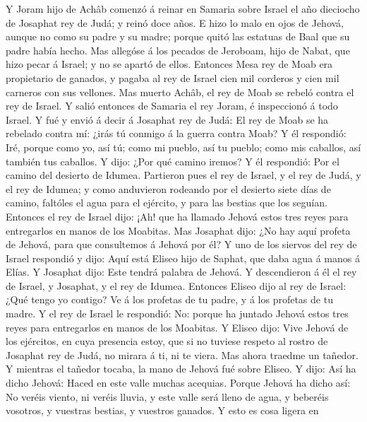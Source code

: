  Y Joram hijo de Achâb comenzó á reinar en Samaria sobre
Israel el año dieciocho de Josaphat rey de Judá; y reinó doce años.
 E hizo lo malo en ojos de Jehová, aunque no como su padre
y su madre; porque quitó las estatuas de Baal que su padre había hecho.
 Mas allegóse á los pecados de Jeroboam, hijo de Nabat,
que hizo pecar á Israel; y no se apartó de ellos. 
Entonces Mesa rey de Moab era propietario de ganados, y pagaba al rey de
Israel cien mil corderos y cien mil carneros con sus vellones.
 Mas muerto Achâb, el rey de Moab se rebeló contra el rey
de Israel.  Y salió entonces de Samaria el rey Joram, é
inspeccionó á todo Israel.  Y fué y envió á decir á
Josaphat rey de Judá: El rey de Moab se ha rebelado contra mí: ¿irás tú
conmigo á la guerra contra Moab? Y él respondió: Iré, porque como yo,
así tú; como mi pueblo, así tu pueblo; como mis caballos, así también
tus caballos.  Y dijo: ¿Por qué camino iremos? Y él
respondió: Por el camino del desierto de Idumea. 
Partieron pues el rey de Israel, y el rey de Judá, y el rey de Idumea; y
como anduvieron rodeando por el desierto siete días de camino, faltóles
el agua para el ejército, y para las bestias que los seguían.
 Entonces el rey de Israel dijo: ¡Ah! que ha llamado
Jehová estos tres reyes para entregarlos en manos de los Moabitas.
 Mas Josaphat dijo: ¿No hay aquí profeta de Jehová, para
que consultemos á Jehová por él? Y uno de los siervos del rey de Israel
respondió y dijo: Aquí está Eliseo hijo de Saphat, que daba agua á manos
á Elías.  Y Josaphat dijo: Este tendrá palabra de Jehová.
Y descendieron á él el rey de Israel, y Josaphat, y el rey de Idumea.
 Entonces Eliseo dijo al rey de Israel: ¿Qué tengo yo
contigo? Ve á los profetas de tu padre, y á los profetas de tu madre. Y
el rey de Israel le respondió: No: porque ha juntado Jehová estos tres
reyes para entregarlos en manos de los Moabitas.  Y
Eliseo dijo: Vive Jehová de los ejércitos, en cuya presencia estoy, que
si no tuviese respeto al rostro de Josaphat rey de Judá, no mirara á ti,
ni te viera.  Mas ahora traedme un tañedor. Y mientras el
tañedor tocaba, la mano de Jehová fué sobre Eliseo.  Y
dijo: Así ha dicho Jehová: Haced en este valle muchas acequias.
 Porque Jehová ha dicho así: No veréis viento, ni veréis
lluvia, y este valle será lleno de agua, y beberéis vosotros, y vuestras
bestias, y vuestros ganados.  Y esto es cosa ligera en
